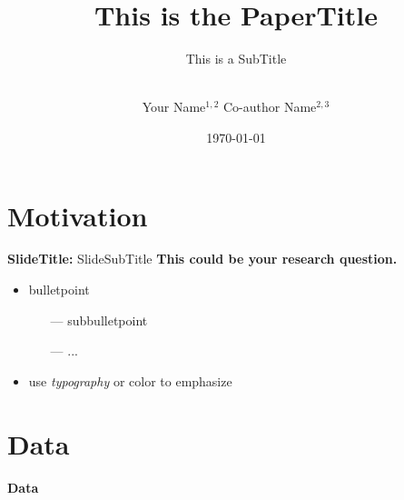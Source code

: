 \documentclass{beamer} %
\title{\textbf{This is the PaperTitle}}
\subtitle{This is a SubTitle}
\author{\\
		Your Name{\footnotesize$^{1,2}$}\quad
		Co-author Name{\footnotesize$^{2,3}$}}
\institute{$^1$Affiliation\quad
		   $^2$Affiliation\quad
		   $^3$Affiliation}
\date{\footnotesize \today}
\begin{document}
	\frame[plain]{\titlepage}
\addtocounter{framenumber}{-1}




\section{Motivation}

\begin{frame}{\textbf{SlideTitle:} SlideSubTitle}
    \textbf{\textcolor{ifo-blue}{This could be your research question.}}
    \vspace{.4cm}
	\begin{itemize}
	    \item bulletpoint
    	\begin{itemize}
    	    \item[---] subbulletpoint
    	    \item[---] ...
    	\end{itemize}
    	\item use \emph{typography} or \textcolor{ifo-blue}{color} to emphasize
	\end{itemize}
\end{frame}

\section{Data}

{
	\begin{frame}[plain]		
    	\vspace{1cm}
    	{\color{white}\LARGE \textbf{Data}}
    \end{frame}
    \addtocounter{framenumber}{-1}
}
\end{document}
